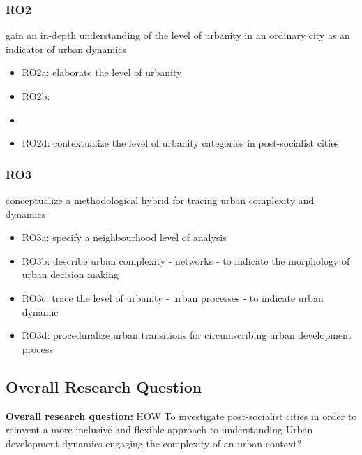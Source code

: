 \documentclass[11pt]{report}
\begin{document}
\subsubsection{RO2}
gain an in-depth understanding of the level of urbanity in an ordinary city as an indicator of urban dynamics
\begin{itemize}
\item RO2a: elaborate the level of urbanity 
\item RO2b:  
\item {}
\item RO2d: contextualize the level of urbanity categories  in post-socialist cities 
\end{itemize}

\subsubsection{RO3}
conceptualize a methodological hybrid for tracing urban complexity and dynamics
\begin{itemize}
\item RO3a: specify a neighbourhood level of analysis 
\item RO3b: describe urban complexity - networks - to indicate the morphology of urban decision making
\item RO3c: trace the level of urbanity - urban processes - to indicate urban dynamic
\item RO3d: proceduralize urban transitions for circumscribing urban development process
\end{itemize}

\subsection{Overall Research Question}

\textbf{Overall research question:} HOW To investigate  post-socialist cities in order to reinvent a more inclusive and flexible approach to understanding Urban development dynamics engaging the complexity of an urban context? 
\end{document}
